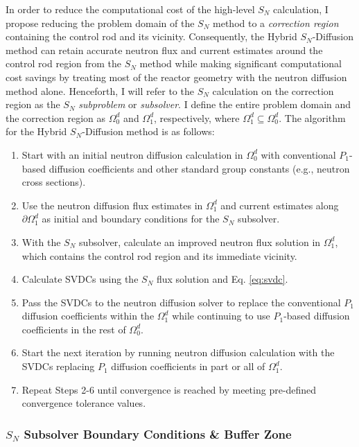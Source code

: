 In order to reduce the computational cost of the high-level $S_N$ calculation, I propose reducing
the problem domain of the $S_N$ method to a \textit{correction region} containing the control rod
and its vicinity. Consequently, the Hybrid $S_N$-Diffusion method can retain accurate neutron flux
and current estimates around the control rod region from the $S_N$ method while making significant
computational cost savings by treating most of the reactor geometry with the neutron diffusion
method alone. Henceforth, I will refer to the $S_N$ calculation on the correction
region as the $S_N$ \textit{subproblem} or \textit{subsolver}. I define the entire problem
domain and the correction region as $\Omega^d_0$ and $\Omega^d_1$, respectively, where
$\Omega^d_1\subseteq\Omega^d_0$. The algorithm for the Hybrid $S_N$-Diffusion method is as follows:
%
\begin{enumerate}
  \item Start with an initial neutron diffusion calculation in $\Omega^d_0$ with conventional
    $P_1$-based diffusion coefficients and other standard group constants (e.g., neutron cross
    sections).
  \item Use the neutron diffusion flux estimates in $\Omega^d_1$ and current estimates along
    $\partial \Omega^d_1$ as initial and boundary conditions for the $S_N$ subsolver.
  \item With the $S_N$ subsolver, calculate an improved neutron flux solution in $\Omega^d_1$,
    which contains the control rod region and its immediate vicinity.
  \item Calculate \glspl{SVDC} using the $S_N$ flux solution and Eq. \ref{eq:svdc}.
  \item Pass the \glspl{SVDC} to the neutron diffusion solver to replace the conventional
    $P_1$ diffusion coefficients within the $\Omega^d_1$ while continuing to use $P_1$-based
    diffusion coefficients in the rest of $\Omega^d_0$.
  \item Start the next iteration by running neutron diffusion calculation with the \glspl{SVDC}
    replacing $P_1$ diffusion coefficients in part or all of $\Omega^d_1$.
  \item Repeat Steps 2-6 until convergence is reached by meeting pre-defined convergence tolerance
    values.
\end{enumerate}

\subsubsection{$S_N$ Subsolver Boundary Conditions \& Buffer Zone}

